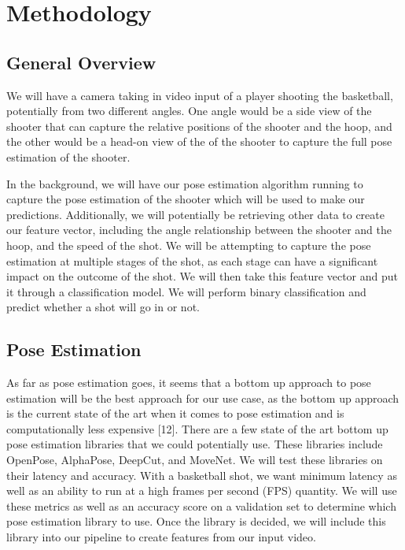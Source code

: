 \documentclass[10pt,twocolumn,letterpaper]{article}
\begin{document}
\section{Methodology}
\subsection{General Overview}
We will have a camera taking in video input of a player shooting the basketball, potentially from two different angles.
One angle would be a side view of the shooter that can capture the relative positions of the shooter and the hoop, and the other
would be a head-on view of the of the shooter to capture the full pose estimation of the shooter.

In the background, we will have our pose estimation algorithm running to capture the pose estimation of the shooter which will be used
to make our predictions. Additionally, we will potentially be retrieving other data to create our feature vector, including the angle relationship
between the shooter and the hoop, and the speed of the shot. We will be attempting to capture the pose estimation at multiple stages of the
shot, as each stage can have a significant impact on the outcome of the shot. We will then take this feature vector and put it through a classification model.
We will perform binary classification and predict whether a shot will go in or not.

\subsection{Pose Estimation}
As far as pose estimation goes, it seems that a bottom up approach to pose estimation will be the best approach for our use case, as the bottom up approach is the
current state of the art when it comes to pose estimation and is computationally less expensive [12]. There are a few state of the art bottom up pose estimation libraries that we could potentially use. These
libraries include OpenPose, AlphaPose, DeepCut, and MoveNet. We will test these libraries on their latency and accuracy. With a basketball shot, we want minimum latency
as well as an ability to run at a high frames per second (FPS) quantity. We will use these metrics as well as an accuracy score on a validation set to determine which pose
estimation library to use. Once the library is decided, we will include this library into our pipeline to create features from our input video.
\end{document}
